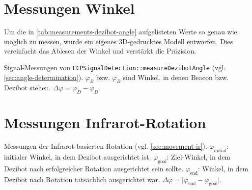 
\section{Messungen Winkel}
\label{sec:measurements-dezibot-angle}

Um die in \autoref{tab:measurements-dezibot-angle} aufgelisteten Werte so genau wie möglich zu messen, wurde ein eigenes 3D\hyphen gedrucktes Modell entworfen. Dies vereinfacht das Ablesen der Winkel und verstärkt die Präzision.

\begin{table}[h!]
    \centering
    
    \caption{Signal-Messungen von \texttt{ECP\-Signal\-Detection::measure\-Dezibot\-Angle} (vgl. \autoref{sec:angle-determination}). $\varphi_B$ bzw. $\varphi_B$ sind Winkel, in denen Beacon bzw. Dezibot stehen. $\Delta\varphi=\varphi_D - \varphi_B$.}
    \label{tab:measurements-dezibot-angle}
\end{table}


\section{Messungen Infrarot-Rotation}
\label{sec:measurements-ir-rotation}

\begin{table}[h!]
    \centering
    
    \caption{Messungen der Infrarot-basierten Rotation (vgl. \autoref{sec:movement-ir}). $\varphi_{\text{initial}}$: initialer Winkel, in dem Dezibot ausgerichtet ist. $\varphi_{\text{goal}}$: Ziel-Winkel, in dem Dezibot nach erfolgreicher Rotation ausgerichtet sein sollte. $\varphi_{\text{end}}$: Winkel, in dem Dezibot nach Rotation tatsächlich ausgerichtet war. $\Delta\varphi = \vert\varphi_{\text{end}}-\varphi_{\text{goal}}\vert$.}
    \label{tab:measurements-ir-rotation}
\end{table}
